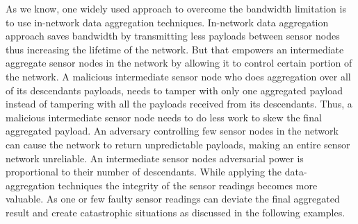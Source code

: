 	As we know, one widely used approach to overcome the bandwidth limitation is to use in-network data aggregation techniques.
	In-network data aggregation approach saves bandwidth by transmitting less payloads between sensor nodes thus increasing the lifetime of the network.
	But that empowers an intermediate aggregate sensor nodes in the network by allowing it to control certain portion of the network.
	A malicious intermediate sensor node who does aggregation over all of its descendants payloads, needs to tamper with only one aggregated payload instead of tampering with all the payloads received from its descendants. 
	Thus, a malicious intermediate sensor node needs to do less work to skew the final aggregated payload.
	An adversary controlling few sensor nodes in the network can cause the network to return unpredictable payloads, making an entire sensor network unreliable.
	An intermediate sensor nodes adversarial power is proportional to their number of descendants.
	While applying the data-aggregation techniques the integrity of the sensor readings becomes more valuable.
	As one or few faulty sensor readings can deviate the final aggregated result and create catastrophic situations as discussed in the following examples.

		


